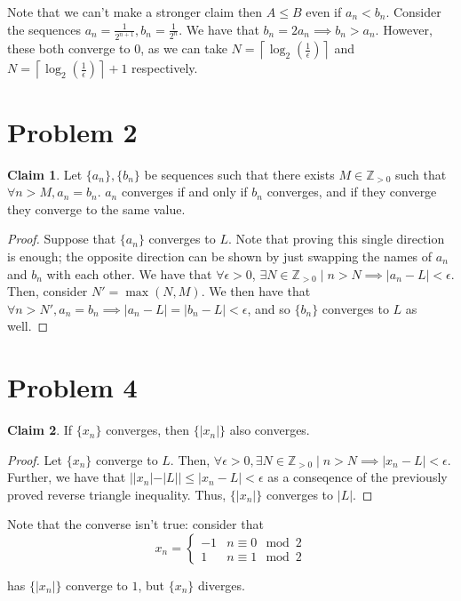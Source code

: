 \documentclass[12pt,letterpaper]{article}
\theoremstyle{definition}
\newtheorem*{claim}{Claim}
\newcommand{\Zg}{\mathbb{Z}_{>0}}
\begin{document}
Note that we can't make a stronger claim then $A \leq B$ even if $a_n < b_n$.
Consider the sequences $a_n = \frac{1}{2^{n+1}}, b_n = \frac{1}{2^n}$. We have
that $b_n = 2a_n \implies b_n > a_n$. However, these both converge to $0$, as we
can take $N = \left\lceil \log_2(\frac{1}{\epsilon}) \right\rceil$ and $N =
\left\lceil \log_2(\frac{1}{\epsilon}) \right\rceil + 1$ respectively.


\section*{Problem 2}

\begin{claim}
  Let $\{a_n\}, \{b_n\}$ be sequences such that there exists $M \in \Zg$ such
  that $\forall n > M, a_n = b_n$. $a_n$ converges if and only if $b_n$
  converges, and if they converge they converge to the same value.
\end{claim}

\begin{proof}
  Suppose that $\{a_n\}$ converges to $L$. Note that proving this single direction is
  enough; the opposite direction can be shown by just swapping the names of
  $a_n$ and $b_n$ with each other. We have that $\forall \epsilon > 0$, $\exists
  N \in \Zg \mid n > N \implies |a_n - L| < \epsilon$. Then, consider $N' =
  \max(N, M)$. We then have that $\forall n > N', a_n = b_n \implies |a_n - L| =
  |b_n - L| < \epsilon$, and so $\{b_n\}$ converges to $L$ as well.
\end{proof}

\section*{Problem 4}

\begin{claim}
  If $\{x_n\}$ converges, then $\{|x_n|\}$ also converges.
\end{claim}

\begin{proof}
  Let $\{x_n\}$ converge to $L$. Then, $\forall \epsilon > 0, \exists N \in \Zg
  \mid n > N \implies |x_n - L| < \epsilon$. Further, we have that $||x_n| -
  |L|| \leq |x_n - L| < \epsilon$ as a conseqence of the previously proved reverse triangle
  inequality. Thus, $\{|x_n|\}$ converges to $|L|$.
\end{proof}

Note that the converse isn't true: consider that
\[
  x_n = \begin{cases}
    -1 & n \equiv 0 \mod 2 \\
    1 & n \equiv 1 \mod 2
  \end{cases}
\]

has $\{|x_n| \}$ converge to $1$, but $\{x_n\}$ diverges.
\end{document}
